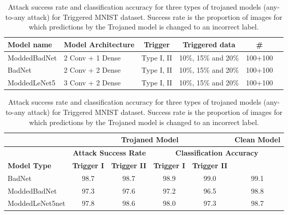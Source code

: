 \documentclass{article}
\begin{document}
\begin{table}[htbp]
	\centering
	\caption{Three models trained on Triggered MNIST dataset. Half the models are for any-to-any attack and half are for any-to-one attack. For the latter case each model only has one target class.}
	\footnotesize


		\begin{tabular}{|l|l|c|c|c|c|}
 		\hline
{\bf  Model name} & {\bf Model Architecture} & {\bf Trigger} & {\bf Triggered data } & {\bf \#} \\
		\hline
		\hline
   ModdedBadNet & 2 Conv + 1 Dense & Type I, II & 10\%, 15\% and 20\% & 100+100\\
		\hline
   BadNet       & 2 Conv + 2 Dense & Type I, II & 10\%, 15\% and 20\% & 100+100\\
		\hline
   ModdedLeNet5 & 3 Conv + 2 Dense & Type I, II & 10\%, 15\% and 20\% & 100+100 \\


 		\hline
		\end{tabular}
\label{table:model-table1}


\vspace{5mm}

\centering
        \caption{Attack success rate and classification accuracy for three types of trojaned models (any-to-any attack) for Triggered MNIST dataset. Success rate is the proportion of images for which predictions by the Trojaned model is changed to an incorrect label.}
        \begin{tabular}{|l|c|c|c|c|c|}
        \hline
&  \multicolumn{4}{c|}{\textbf{Trojaned Model}} & \textbf{Clean Model} \\
        \hline

         & \multicolumn{2}{c|}{\textbf{Attack Success Rate}} & \multicolumn{3}{c|}{\textbf{Classification Accuracy}}  \\
        \hline
        \textbf{Model Type}  & \textbf{Trigger I} & \textbf{Trigger II}  & \textbf{Trigger I} & \textbf{Trigger II} & \\
        \hline\hline
        BadNet          & 98.7 & 98.7 & 98.9 & 99.0 & 99.1 \\
        ModdedBadNet    & 97.3 & 97.6 & 97.2 & 96.5 & 98.8 \\
        ModdedLeNet5net & 97.8 & 98.6 & 98.0 & 97.3 & 98.7 \\
\hline
    \end{tabular}
        \label{tab:MNIST_model-A}\end{table}
\end{document}

